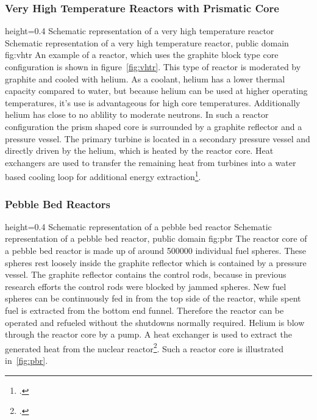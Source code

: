 \subsubsection{Very High Temperature Reactors with Prismatic Core}
    {height=0.4\textheight}
    {Schematic representation of a very high temperature reactor}
    {Schematic representation of a very high temperature reactor, public domain}
    {fig:vhtr}
An example of a reactor, which uses the graphite block type core configuration is shown in figure~\ref{fig:vhtr}.
This type of reactor is moderated by graphite and cooled with helium. As a coolant, helium has
a lower thermal capacity compared to water, but because helium can be used at higher operating
temperatures, it's use is advantageous for high core temperatures. Additionally helium has close
to no ablility to moderate neutrons. In such a reactor configuration
the prism shaped core is surrounded by a graphite reflector and a pressure vessel. The primary turbine
is located in a secondary pressure vessel and directly driven by the helium, which is heated by the
reactor core. Heat exchangers are used to transfer the remaining heat from turbines into a water based
cooling loop for additional energy extraction\footcite{VHTRTS}.
\subsubsection{Pebble Bed Reactors}\label{chap:pbr}
    {height=0.4\textheight}
    {Schematic representation of a pebble bed reactor}
    {Schematic representation of a pebble bed reactor, public domain}
    {fig:pbr}
The reactor core of a pebble bed reactor is made up of around 500000 individual fuel spheres. These
spheres rest loosely inside the graphite reflector which is contained by a pressure vessel. The graphite
reflector contains the control rods, because in previous research efforts the control rods were blocked
by jammed spheres. New fuel spheres can be continuously fed in from the top side of the reactor, while
spent fuel is extracted from the bottom end funnel. Therefore the reactor can be operated and refueled
without the shutdowns normally required. Helium is blow through the reactor core by a
pump. A heat exchanger is used to extract the generated heat from the nuclear reactor\footcite[60-62]{T4Gen}.
Such a reactor core is illustrated in~\ref{fig:pbr}.
